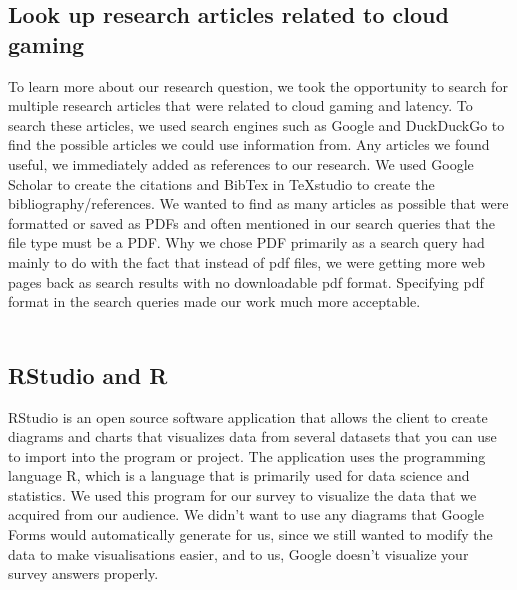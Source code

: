 \subsection{Look up research articles related to cloud gaming}
To learn more about our research question, we took the opportunity to search for multiple research articles that were related to cloud gaming and latency. To search these articles, we used search engines such as Google and DuckDuckGo to find the possible articles we could use information from. Any articles we found useful, we immediately added as references to our research. We used Google Scholar to create the citations and BibTex in TeXstudio to create the bibliography/references. We wanted to find as many articles as possible that were formatted or saved as PDFs and often mentioned in our search queries that the file type must be a PDF. Why we chose PDF primarily as a search query had mainly to do with the fact that instead of pdf files, we were getting more web pages back as search results with no downloadable pdf format. Specifying pdf format in the search queries made our work much more acceptable.
\\\\
\subsection{RStudio and R}
RStudio is an open source software application that allows the client to create diagrams and charts that visualizes data from several datasets that you can use to import into the program or project. The application uses the programming language R, which is a language that is primarily used for data science and statistics. We used this program for our survey to visualize the data that we acquired from our audience. We didn't want to use any diagrams that Google Forms would automatically generate for us, since we still wanted to modify the data to make visualisations easier, and to us, Google doesn't visualize your survey answers properly.